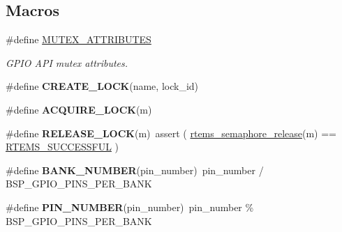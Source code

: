 \subsection*{Macros}
\begin{DoxyCompactItemize}
\item 
\#define \mbox{\hyperlink{gpio-support_8c_ad1d5fdea088f960e016c1cac13223510}{M\+U\+T\+E\+X\+\_\+\+A\+T\+T\+R\+I\+B\+U\+T\+ES}}
\begin{DoxyCompactList}\small\item\em G\+P\+IO A\+PI mutex attributes. \end{DoxyCompactList}\item 
\#define {\bfseries C\+R\+E\+A\+T\+E\+\_\+\+L\+O\+CK}(name,  lock\+\_\+id)
\item 
\#define {\bfseries A\+C\+Q\+U\+I\+R\+E\+\_\+\+L\+O\+CK}(m)
\item 
\mbox{\label{gpio-support_8c_a4a3836453d3340695a751570770b9f77}} 
\#define {\bfseries R\+E\+L\+E\+A\+S\+E\+\_\+\+L\+O\+CK}(m)~assert ( \mbox{\hyperlink{group__ClassicSem_gae493f08a92f963ecddc7889181808402}{rtems\+\_\+semaphore\+\_\+release}}(m) == \mbox{\hyperlink{group__ClassicStatus_gga545d41846817eaba6143d52ee4d9e9fea8a23e2d94778f09399da984d73562536}{R\+T\+E\+M\+S\+\_\+\+S\+U\+C\+C\+E\+S\+S\+F\+UL}} )
\item 
\mbox{\label{gpio-support_8c_a5a77bac742e408b00ab466c363d12f40}} 
\#define {\bfseries B\+A\+N\+K\+\_\+\+N\+U\+M\+B\+ER}(pin\+\_\+number)~pin\+\_\+number / B\+S\+P\+\_\+\+G\+P\+I\+O\+\_\+\+P\+I\+N\+S\+\_\+\+P\+E\+R\+\_\+\+B\+A\+NK
\item 
\mbox{\label{gpio-support_8c_a7689b8152da8e1c4420798fae92c257d}} 
\#define {\bfseries P\+I\+N\+\_\+\+N\+U\+M\+B\+ER}(pin\+\_\+number)~pin\+\_\+number \% B\+S\+P\+\_\+\+G\+P\+I\+O\+\_\+\+P\+I\+N\+S\+\_\+\+P\+E\+R\+\_\+\+B\+A\+NK
\end{DoxyCompactItemize}
